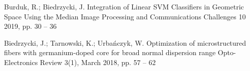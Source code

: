 
\begin{cventries}

    \cventry
    {Burduk, R.; Biedrzycki, J.}
    {Integration of Linear SVM Classifiers in Geometric Space Using the Median}
    {Image Processing and Communications Challenges 10}
    {2019, pp. 30 -- 36}
    {}

    \cventry
    {Biedrzycki, J.; Tarnowski, K.; Urbańczyk, W.}
    {Optimization of microstructured fibers with germanium-doped core for broad normal dispersion range}
    {Opto-Electronics Review}
    {3(1), March 2018, pp. 57 -- 62}
    {}

\end{cventries}
